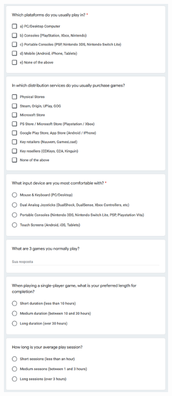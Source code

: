 \begin{figure}[!ht]
    \begin{center}
        \includegraphics[width=24em]{figures/fig-player-profile-survey-pt2.png}
    \end{center}
\end{figure}

